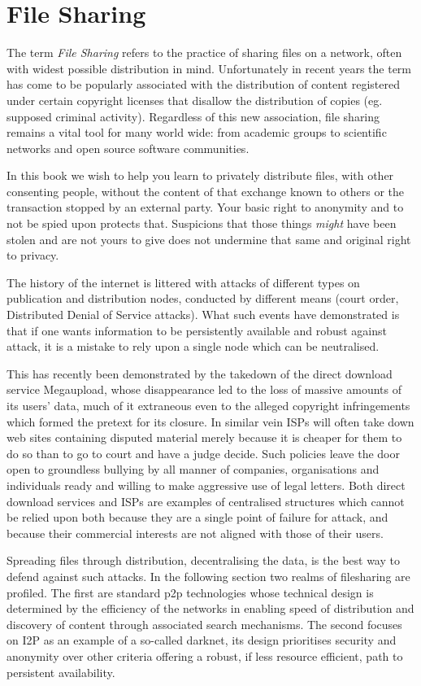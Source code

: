 \section{File Sharing}

The term \emph{File Sharing} refers to the practice of sharing files on
a network, often with widest possible distribution in mind.
Unfortunately in recent years the term has come to be popularly
associated with the distribution of content registered under certain
copyright licenses that disallow the distribution of copies (eg.
supposed criminal activity). Regardless of this new association, file
sharing remains a vital tool for many world wide: from academic groups
to scientific networks and open source software communities.

In this book we wish to help you learn to privately distribute files,
with other consenting people, without the content of that exchange known
to others or the transaction stopped by an external party. Your basic
right to anonymity and to not be spied upon protects that. Suspicions
that those things \emph{might} have been stolen and are not yours to
give does not undermine that same and original right to privacy.

The history of the internet is littered with attacks of different types
on publication and distribution nodes, conducted by different means
(court order, Distributed Denial of Service attacks). What such events
have demonstrated is that if one wants information to be persistently
available and robust against attack, it is a mistake to rely upon a
single node which can be neutralised.

This has recently been demonstrated by the takedown of the direct
download service Megaupload, whose disappearance led to the loss of
massive amounts of its users' data, much of it extraneous even to the
alleged copyright infringements which formed the pretext for its
closure. In similar vein ISPs will often take down web sites containing
disputed material merely because it is cheaper for them to do so than to
go to court and have a judge decide. Such policies leave the door open
to groundless bullying by all manner of companies, organisations and
individuals ready and willing to make aggressive use of legal letters.
Both direct download services and ISPs are examples of centralised
structures which cannot be relied upon both because they are a single
point of failure for attack, and because their commercial interests are
not aligned with those of their users.

Spreading files through distribution, decentralising the data, is the
best way to defend against such attacks. In the following section two
realms of filesharing are profiled. The first are standard p2p
technologies whose technical design is determined by the efficiency of
the networks in enabling speed of distribution and discovery of content
through associated search mechanisms. The second focuses on I2P as an
example of a so-called darknet, its design prioritises security and
anonymity over other criteria offering a robust, if less resource
efficient, path to persistent availability.

